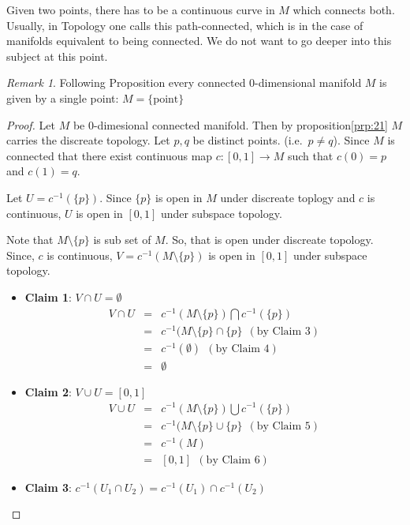\documentclass[
]{book}
\theoremstyle{definition}
\theoremstyle{definition}
\theoremstyle{definition}
\theoremstyle{definition}
\theoremstyle{remark}
\newtheorem*{remark}{Remark}
\begin{document}
Given two points, there has to be a continuous curve in \(M\) which connects both. Usually, in Topology one calls this path-connected, which is in the case of manifolds equivalent to being connected. We do not want to go deeper into this subject at this point.

\begin{remark}
Following Proposition every connected 0-dimensional manifold \(M\)
is given by a single point: \(M = \{\text{point}\}\)
\end{remark}

\begin{proof}
Let \(M\) be 0-dimesional connected manifold. Then by proposition\ref{prp:21} \(M\) carries the discreate topology. Let \(p,q\) be distinct points. (i.e.~\(p\neq q\)). Since \(M\) is connected that there exist continuous map \(c:[0,1]\to M\) such that \(c(0)=p\) and \(c(1)=q\).

Let \(U=c^{-1}(\{p\})\). Since \(\{p\}\) is open in \(M\) under discreate toplogy and \(c\) is continuous, \(U\) is open in \([0,1]\) under subspace topology.

Note that \(M\setminus \{p\}\) is sub set of \(M\). So, that is open under discreate topology. Since, \(c\) is continuous, \(V=c^{-1}(M\setminus \{p\})\) is open in \([0,1]\) under subspace topology.

\begin{itemize}
\item
  \textbf{Claim 1}: \(V \cap U = \emptyset\)\\
  \begin{eqnarray}
  V \cap U &=& c^{-1}(M\setminus \{p\}) \bigcap c^{-1}(\{p\})\\
  &=& c^{-1}(M\setminus \{p\} \cap \{p\}~~(\text{by Claim 3})\\
  &=& c^{-1}(\emptyset)~~(\text{by Claim 4})\\
  &=& \emptyset
  \end{eqnarray}
\item
  \textbf{Claim 2}: \(V \cup U = [0,1]\)\\
  \begin{eqnarray}
  V \cup U &=& c^{-1}(M\setminus \{p\}) \bigcup c^{-1}(\{p\})\\
  &=& c^{-1}(M\setminus \{p\} \cup \{p\}~~(\text{by Claim 5})\\
  &=& c^{-1}(M)\\
  &=& [0,1]  ~~(\text{by Claim 6})
  \end{eqnarray}
\item
  \textbf{Claim 3}: \(c^{-1}(U_1\cap U_2)= c^{-1}(U_1)\cap c^{-1}(U_2)\)\\


\end{itemize}
\end{proof}
\end{document}
